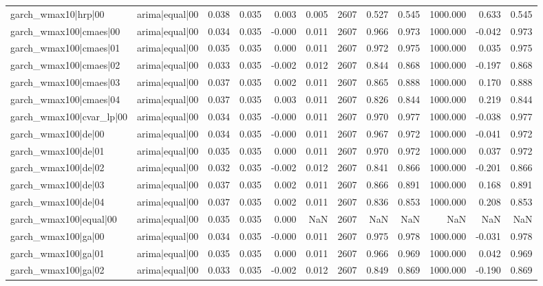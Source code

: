 \begin{table}
\begin{tabular}{llrrrrrrrrrr}
garch\_wmax10|hrp|00 & arima|equal|00 & 0.038 & 0.035 & 0.003 & 0.005 & 2607 & 0.527 & 0.545 & 1000.000 & 0.633 & 0.545 \\
garch\_wmax100|cmaes|00 & arima|equal|00 & 0.034 & 0.035 & -0.000 & 0.011 & 2607 & 0.966 & 0.973 & 1000.000 & -0.042 & 0.973 \\
garch\_wmax100|cmaes|01 & arima|equal|00 & 0.035 & 0.035 & 0.000 & 0.011 & 2607 & 0.972 & 0.975 & 1000.000 & 0.035 & 0.975 \\
garch\_wmax100|cmaes|02 & arima|equal|00 & 0.033 & 0.035 & -0.002 & 0.012 & 2607 & 0.844 & 0.868 & 1000.000 & -0.197 & 0.868 \\
garch\_wmax100|cmaes|03 & arima|equal|00 & 0.037 & 0.035 & 0.002 & 0.011 & 2607 & 0.865 & 0.888 & 1000.000 & 0.170 & 0.888 \\
garch\_wmax100|cmaes|04 & arima|equal|00 & 0.037 & 0.035 & 0.003 & 0.011 & 2607 & 0.826 & 0.844 & 1000.000 & 0.219 & 0.844 \\
garch\_wmax100|cvar\_lp|00 & arima|equal|00 & 0.034 & 0.035 & -0.000 & 0.011 & 2607 & 0.970 & 0.977 & 1000.000 & -0.038 & 0.977 \\
garch\_wmax100|de|00 & arima|equal|00 & 0.034 & 0.035 & -0.000 & 0.011 & 2607 & 0.967 & 0.972 & 1000.000 & -0.041 & 0.972 \\
garch\_wmax100|de|01 & arima|equal|00 & 0.035 & 0.035 & 0.000 & 0.011 & 2607 & 0.970 & 0.972 & 1000.000 & 0.037 & 0.972 \\
garch\_wmax100|de|02 & arima|equal|00 & 0.032 & 0.035 & -0.002 & 0.012 & 2607 & 0.841 & 0.866 & 1000.000 & -0.201 & 0.866 \\
garch\_wmax100|de|03 & arima|equal|00 & 0.037 & 0.035 & 0.002 & 0.011 & 2607 & 0.866 & 0.891 & 1000.000 & 0.168 & 0.891 \\
garch\_wmax100|de|04 & arima|equal|00 & 0.037 & 0.035 & 0.002 & 0.011 & 2607 & 0.836 & 0.853 & 1000.000 & 0.208 & 0.853 \\
garch\_wmax100|equal|00 & arima|equal|00 & 0.035 & 0.035 & 0.000 & NaN & 2607 & NaN & NaN & NaN & NaN & NaN \\
garch\_wmax100|ga|00 & arima|equal|00 & 0.034 & 0.035 & -0.000 & 0.011 & 2607 & 0.975 & 0.978 & 1000.000 & -0.031 & 0.978 \\
garch\_wmax100|ga|01 & arima|equal|00 & 0.035 & 0.035 & 0.000 & 0.011 & 2607 & 0.966 & 0.969 & 1000.000 & 0.042 & 0.969 \\
garch\_wmax100|ga|02 & arima|equal|00 & 0.033 & 0.035 & -0.002 & 0.012 & 2607 & 0.849 & 0.869 & 1000.000 & -0.190 & 0.869 \\

\end{tabular}
\end{table}
